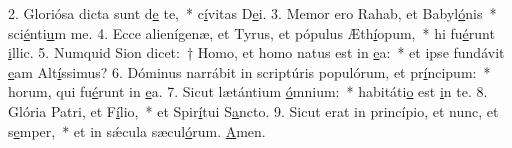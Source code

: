 2. Gloriósa dicta sunt d\uline{e} te,~* c\uline{í}vitas D\uline{e}i.
3. Memor ero Rahab, et Babyl\uline{ó}nis~* sci\uline{é}nti\uline{u}m me.
4. Ecce alienígenæ, et Tyrus, et pópulus Æth\uline{í}opum,~* hi fu\uline{é}runt \uline{i}llic.
5. Numquid Sion dicet:~† Homo, et homo natus est in \uline{e}a:~* et ipse fundávit \uline{e}am Alt\uline{í}ssimus?
6. Dóminus narrábit in scriptúris populórum, et pr\uline{í}ncipum:~* horum, qui fu\uline{é}runt in \uline{e}a.
7. Sicut lætántium \uline{ó}mnium:~* habitáti\uline{o} est \uline{i}n te.
8. Glória Patri, et F\uline{í}lio,~* et Spir\uline{í}tui S\uline{a}ncto.
9. Sicut erat in princípio, et nunc, et s\uline{e}mper,~* et in sǽcula sæcul\uline{ó}rum. \uline{A}men.
